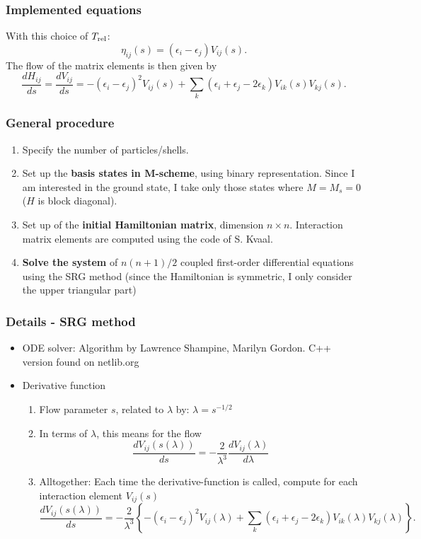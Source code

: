 \documentclass[9pt]{beamer}
\begin{document}
\begin{frame}
\frametitle{Implemented equations}
With this choice of $T_{\rm rel}$:
\[
 \eta_{ij}(s) = \left( \epsilon_i - \epsilon_j \right) V_{ij}(s).
\]
The flow of the matrix elements is then given by 
\begin{equation}
\frac{d H_{ij}}{ds }= \frac{d V_{ij}}{ds } = -(\epsilon_i - \epsilon_j)^2 V_{ij}(s) + \sum\limits_k \left(\epsilon_i + \epsilon_j -2 \epsilon_k \right) V_{ik}(s) V_{kj}(s).
\label{eq:flow}
\end{equation}



\end{frame}

\begin{frame}
\frametitle{General procedure}
\begin{enumerate}[1)]
\item Specify the number of particles/shells.
\item Set up the \textbf{basis states in M-scheme}, using binary representation. Since I am interested in the ground state, I take only those states where $M = M_s = 0$ ($H$ is block diagonal).
\item Set up of the \textbf{initial Hamiltonian matrix}, dimension $n\times n$. Interaction matrix elements are computed using the code of S. Kvaal.
\item \textbf{Solve the system} of $n(n+1)/2$ coupled first-order differential equations using the SRG method (since the Hamiltonian is symmetric, I only consider the upper triangular part)
\end{enumerate}
\end{frame}

\begin{frame}
\frametitle{Details - SRG method}
\begin{itemize}
\item ODE solver: Algorithm by Lawrence Shampine, Marilyn Gordon. C++ version found on netlib.org
\item Derivative function
\begin{enumerate}[-]
\item Flow parameter $s$, related to $\lambda$ by:
$ \lambda = s^{-1/2} $
\item In terms of $\lambda$, this means for the flow
\[
\frac{dV_{ij}(s(\lambda))}{ds} = -\frac{2}{\lambda^3}\frac{dV_{ij}(\lambda)}{d\lambda}
\]
\item Alltogether: Each time the derivative-function is called, compute for each interaction element $V_{ij}(s)$
\[
\frac{d V_{ij}(s(\lambda))}{ds} = -\frac{2}{\lambda^3}\left\lbrace-(\epsilon_i - \epsilon_j)^2 V_{ij}(\lambda) + \sum\limits_k \left(\epsilon_i + \epsilon_j -2 \epsilon_k \right) V_{ik}(\lambda) V_{kj}(\lambda)\right\rbrace.
\]
\end{enumerate}
\end{itemize}

\end{frame}
\end{document}

